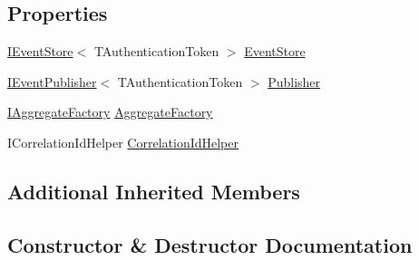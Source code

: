 \subsection*{Properties}
\begin{DoxyCompactItemize}
\item 
\hyperlink{interfaceCqrs_1_1Events_1_1IEventStore}{I\+Event\+Store}$<$ T\+Authentication\+Token $>$ \hyperlink{classCqrs_1_1Domain_1_1Repository_a9adbd73546e04ef67c8fb032e9c6d1a8}{Event\+Store}
\item 
\hyperlink{interfaceCqrs_1_1Events_1_1IEventPublisher}{I\+Event\+Publisher}$<$ T\+Authentication\+Token $>$ \hyperlink{classCqrs_1_1Domain_1_1Repository_a11b1d3a66404b212e93ca706e7c5eea4}{Publisher}
\item 
\hyperlink{interfaceCqrs_1_1Domain_1_1Factories_1_1IAggregateFactory}{I\+Aggregate\+Factory} \hyperlink{classCqrs_1_1Domain_1_1Repository_a02cee15b1d3f603c1ae437b366e83085}{Aggregate\+Factory}
\item 
I\+Correlation\+Id\+Helper \hyperlink{classCqrs_1_1Domain_1_1Repository_a3504ed9a3ff1c689ba89c574619893af}{Correlation\+Id\+Helper}
\end{DoxyCompactItemize}
\subsection*{Additional Inherited Members}


\subsection{Constructor \& Destructor Documentation}
\mbox{\label{classCqrs_1_1Domain_1_1Repository_ab513757cb27ab3f34a1cd4d5396aa0c1}} 
